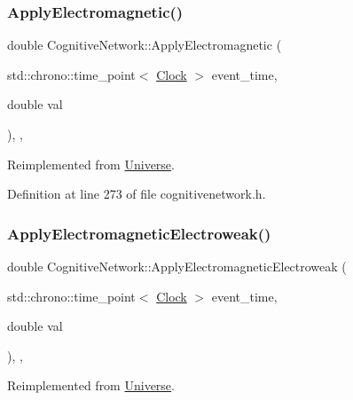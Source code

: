 \subsubsection{\texorpdfstring{Apply\+Electromagnetic()}{ApplyElectromagnetic()}}
{\footnotesize\ttfamily double Cognitive\+Network\+::\+Apply\+Electromagnetic (\begin{DoxyParamCaption}\item[{std\+::chrono\+::time\+\_\+point$<$ \mbox{\hyperlink{universe_8h_a0ef8d951d1ca5ab3cfaf7ab4c7a6fd80}{Clock}} $>$}]{event\+\_\+time,  }\item[{double}]{val }\end{DoxyParamCaption})\hspace{0.3cm}{\ttfamily [inline]}, {\ttfamily [final]}, {\ttfamily [virtual]}}



Reimplemented from \mbox{\hyperlink{class_universe_a1f787da78fa196ba635db21a9e91dabb}{Universe}}.



Definition at line 273 of file cognitivenetwork.\+h.

\mbox{\label{class_cognitive_network_a9753f52c9e36ad44e9fac1d3e38a0770}} 
\subsubsection{\texorpdfstring{Apply\+Electromagnetic\+Electroweak()}{ApplyElectromagneticElectroweak()}}
{\footnotesize\ttfamily double Cognitive\+Network\+::\+Apply\+Electromagnetic\+Electroweak (\begin{DoxyParamCaption}\item[{std\+::chrono\+::time\+\_\+point$<$ \mbox{\hyperlink{universe_8h_a0ef8d951d1ca5ab3cfaf7ab4c7a6fd80}{Clock}} $>$}]{event\+\_\+time,  }\item[{double}]{val }\end{DoxyParamCaption})\hspace{0.3cm}{\ttfamily [inline]}, {\ttfamily [final]}, {\ttfamily [virtual]}}



Reimplemented from \mbox{\hyperlink{class_universe_a4c36c1ab30db993307f88363dde5e8c5}{Universe}}.



